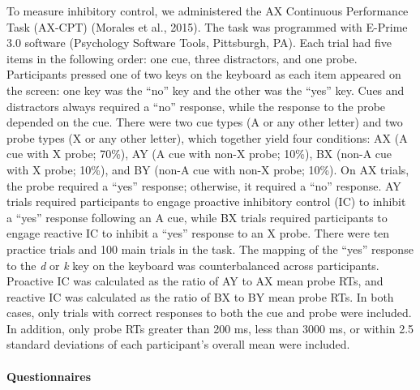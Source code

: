\documentclass[
  12pt,
  twoside]{article}
\begin{document}
To measure inhibitory control, we administered the AX Continuous Performance Task (AX-CPT) (Morales et al., 2015).
The task was programmed with E-Prime 3.0 software (Psychology Software Tools, Pittsburgh, PA).
Each trial had five items in the following order: one cue, three distractors, and one probe.
Participants pressed one of two keys on the keyboard as each item appeared on the screen: one key was the ``no'' key and the other was the ``yes'' key.
Cues and distractors always required a ``no'' response, while the response to the probe depended on the cue.
There were two cue types (A or any other letter) and two probe types (X or any other letter), which together yield four conditions: AX (A cue with X probe; 70\%), AY (A cue with non-X probe; 10\%), BX (non-A cue with X probe; 10\%), and BY (non-A cue with non-X probe; 10\%).
On AX trials, the probe required a ``yes'' response; otherwise, it required a ``no'' response.
AY trials required participants to engage proactive inhibitory control (IC) to inhibit a ``yes'' response following an A cue, while BX trials required participants to engage reactive IC to inhibit a ``yes'' response to an X probe.
There were ten practice trials and 100 main trials in the task.
The mapping of the ``yes'' response to the \emph{d} or \emph{k} key on the keyboard was counterbalanced across participants.
Proactive IC was calculated as the ratio of AY to AX mean probe RTs, and reactive IC was calculated as the ratio of BX to BY mean probe RTs.
In both cases, only trials with correct responses to both the cue and probe were included.
In addition, only probe RTs greater than 200 ms, less than 3000 ms, or within 2.5 standard deviations of each participant's overall mean were included.

\hypertarget{methods-quest}{%
\paragraph{Questionnaires}\label{methods-quest}}
\end{document}
